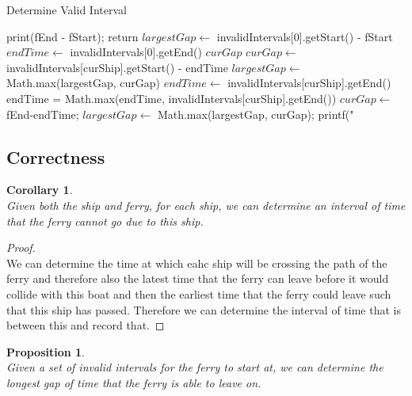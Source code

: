 \documentclass[12pt]{article}
\newtheorem{corollary}[theorem]{Corollary}
\newtheorem{proposition}[theorem]{Proposition}
\begin{document}
\begin{algorithm}[H]
\caption{Determine Valid Interval}
\begin{algorithmic}
            print(fEnd - fStart); return
        \EndIf
        \State $largestGap \gets$ invalidIntervals[0].getStart() - fStart
        \State $endTime \gets$ invalidIntervals[0].getEnd()
        \State $curGap$
                \State $curGap \gets$ invalidIntervals[curShip].getStart() - endTime
                \State $largestGap \gets$ Math.max(largestGap, curGap)
                \State $endTime \gets$ invalidIntervals[curShip].getEnd()
            \Else
                \State endTime = Math.max(endTime, invalidIntervals[curShip].getEnd())
            \EndIf
        \EndFor
        \State $curGap \gets$ fEnd-endTime;
        \State $largestGap \gets$ Math.max(largestGap, curGap);
        \State printf("%
    \EndProcedure
\end{algorithmic}
\end{algorithm}



\subsection{Correctness}
\begin{corollary}
~ \\ \indent Given both the ship and ferry, for each ship, we can determine an interval of time that the ferry cannot
go due to this ship.
\end{corollary}

\begin{proof}
~ \\ \indent We can determine the time at which eahc ship will be crossing the path of the ferry and therefore also the
latest time that the ferry can leave before it would collide with this boat and then the earliest time that the ferry
could leave such that this ship has passed. Therefore we can determine the interval of time that is between this
and record that.
\end{proof}

\begin{proposition}
~ \\ \indent Given a set of invalid intervals for the ferry to start at, we can determine the longest gap of time that
the ferry is able to leave on.
\end{proposition}
\end{document}
